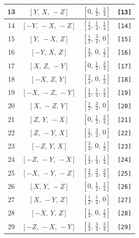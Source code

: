 \documentclass[fleqn,8pt]{jsarticle}
\begin{document}
\begin{longtable}{cccc}
13 & $\left[ Y,\, X,\, - Z \right]$ & $\left[ 0,\, \frac{1}{2},\, \frac{3}{4} \right]$ & {\tt [13]} \\ \hline
14 & $\left[ - Y,\, - X,\, - Z \right]$ & $\left[ \frac{1}{4},\, \frac{1}{4},\, \frac{1}{4} \right]$ & {\tt [14]} \\ \hline
15 & $\left[ Y,\, - X,\, Z \right]$ & $\left[ \frac{1}{2},\, \frac{3}{4},\, 0 \right]$ & {\tt [15]} \\ \hline
16 & $\left[ - Y,\, X,\, Z \right]$ & $\left[ \frac{3}{4},\, 0,\, \frac{1}{2} \right]$ & {\tt [16]} \\ \hline
17 & $\left[ X,\, Z,\, - Y \right]$ & $\left[ 0,\, \frac{1}{2},\, \frac{3}{4} \right]$ & {\tt [17]} \\ \hline
18 & $\left[ - X,\, Z,\, Y \right]$ & $\left[ \frac{3}{4},\, 0,\, \frac{1}{2} \right]$ & {\tt [18]} \\ \hline
19 & $\left[ - X,\, - Z,\, - Y \right]$ & $\left[ \frac{1}{4},\, \frac{1}{4},\, \frac{1}{4} \right]$ & {\tt [19]} \\ \hline
20 & $\left[ X,\, - Z,\, Y \right]$ & $\left[ \frac{1}{2},\, \frac{3}{4},\, 0 \right]$ & {\tt [20]} \\ \hline
21 & $\left[ Z,\, Y,\, - X \right]$ & $\left[ 0,\, \frac{1}{2},\, \frac{3}{4} \right]$ & {\tt [21]} \\ \hline
22 & $\left[ Z,\, - Y,\, X \right]$ & $\left[ \frac{1}{2},\, \frac{3}{4},\, 0 \right]$ & {\tt [22]} \\ \hline
23 & $\left[ - Z,\, Y,\, X \right]$ & $\left[ \frac{3}{4},\, 0,\, \frac{1}{2} \right]$ & {\tt [23]} \\ \hline
24 & $\left[ - Z,\, - Y,\, - X \right]$ & $\left[ \frac{1}{4},\, \frac{1}{4},\, \frac{1}{4} \right]$ & {\tt [24]} \\ \hline
25 & $\left[ - X,\, - Y,\, - Z \right]$ & $\left[ \frac{3}{4},\, \frac{3}{4},\, \frac{3}{4} \right]$ & {\tt [25]} \\ \hline
26 & $\left[ X,\, Y,\, - Z \right]$ & $\left[ 0,\, \frac{1}{2},\, \frac{1}{4} \right]$ & {\tt [26]} \\ \hline
27 & $\left[ X,\, - Y,\, Z \right]$ & $\left[ \frac{1}{2},\, \frac{1}{4},\, 0 \right]$ & {\tt [27]} \\ \hline
28 & $\left[ - X,\, Y,\, Z \right]$ & $\left[ \frac{1}{4},\, 0,\, \frac{1}{2} \right]$ & {\tt [28]} \\ \hline
29 & $\left[ - Z,\, - X,\, - Y \right]$ & $\left[ \frac{3}{4},\, \frac{3}{4},\, \frac{3}{4} \right]$ & {\tt [29]} \\ \hline

\end{longtable}
\end{document}
